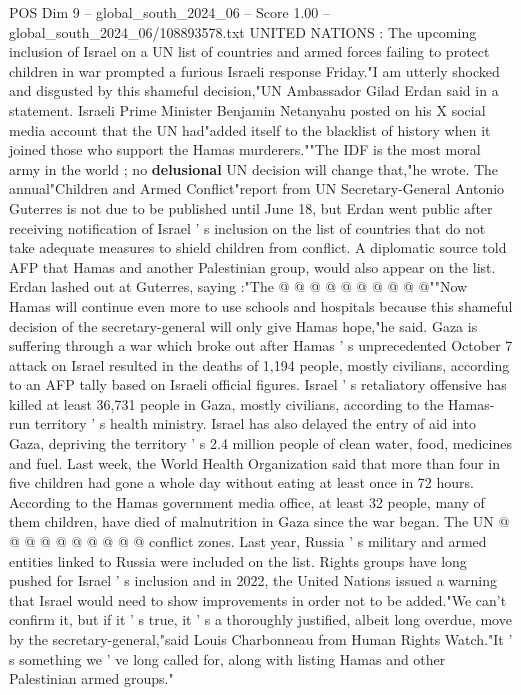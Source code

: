 \begin{textsample}{POS Dim 9 – global\_south\_2024\_06 – Score 1.00 – global\_south\_2024\_06/108893578.txt}  \label{ex:f9_pos_091}
UNITED NATIONS : The upcoming inclusion of Israel on a UN list of countries and armed forces failing to protect children in war prompted a furious Israeli response Friday."I am utterly shocked and disgusted by this shameful decision,"UN Ambassador Gilad Erdan said in a statement.
Israeli Prime Minister Benjamin Netanyahu posted on his X social media account that the UN had"added itself to the blacklist of history when it joined those who support the Hamas murderers.""The IDF is the most moral army in the world ; no \textbf{delusional} UN decision will change that,"he wrote.
The annual"Children and Armed Conflict"report from UN Secretary-General Antonio Guterres is not due to be published until June 18, but Erdan went public after receiving notification of Israel ' s inclusion on the list of countries that do not take adequate measures to shield children from conflict.
A diplomatic source told AFP that Hamas and another Palestinian group, would also appear on the list.
Erdan lashed out at Guterres, saying :"The @ @ @ @ @ @ @ @ @ @""Now Hamas will continue even more to use schools and hospitals because this shameful decision of the secretary-general will only give Hamas hope,"he said.
Gaza is suffering through a war which broke out after Hamas ' s unprecedented October 7 attack on Israel resulted in the deaths of 1,194 people, mostly civilians, according to an AFP tally based on Israeli official figures.
Israel ' s retaliatory offensive has killed at least 36,731 people in Gaza, mostly civilians, according to the Hamas-run territory ' s health ministry.
Israel has also delayed the entry of aid into Gaza, depriving the territory ' s 2.4 million people of clean water, food, medicines and fuel.
Last week, the World Health Organization said that more than four in five children had gone a whole day without eating at least once in 72 hours.
According to the Hamas government media office, at least 32 people, many of them children, have died of malnutrition in Gaza since the war began.
The UN @ @ @ @ @ @ @ @ @ @ conflict zones.
Last year, Russia ' s military and armed entities linked to Russia were included on the list.
Rights groups have long pushed for Israel ' s inclusion and in 2022, the United Nations issued a warning that Israel would need to show improvements in order not to be added."We can't confirm it, but if it ' s true, it ' s a thoroughly justified, albeit long overdue, move by the secretary-general,"said Louis Charbonneau from Human Rights Watch."It ' s something we ' ve long called for, along with listing Hamas and other Palestinian armed groups."

\end{textsample}
